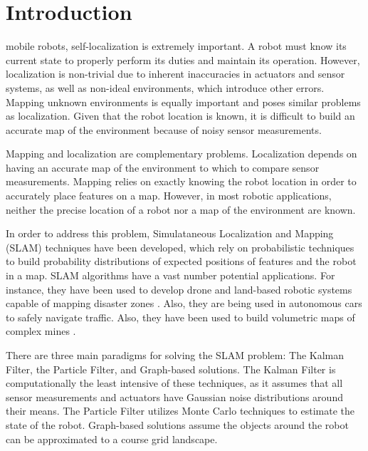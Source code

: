 \documentclass[journal]{IEEEtran}
\begin{document}
\section{Introduction}
% 
% 
% 
% 
 mobile robots, self-localization is extremely important. 
A robot must know its current state to properly perform its duties and maintain its operation. 
However, localization is non-trivial due to inherent inaccuracies in actuators and sensor 
systems, as well as non-ideal environments, which introduce other errors. Mapping unknown 
environments is equally important and poses similar problems as localization. Given that 
the robot location is known, it is difficult to build an accurate map of the environment 
because of noisy sensor measurements. 

Mapping and localization are complementary problems. Localization depends on having an 
accurate map of the environment to which to compare sensor measurements. Mapping relies 
on exactly knowing the robot location in order to accurately place features on a map. 
However, in most robotic applications, neither the precise location of a robot nor a 
map of the environment are known. 

In order to address this problem, Simulataneous Localization and Mapping (SLAM) techniques 
have been developed, which rely on probabilistic techniques to build probability 
distributions of expected positions of features and the robot in a map. SLAM algorithms 
have a vast number potential applications. For instance, they have been used to develop 
drone and land-based robotic systems capable of mapping disaster zones 
\cite{drone-response, mapping-disaster-areas}. Also, they are being used in autonomous cars to 
safely navigate traffic. Also, they have been used to build volumetric maps of complex mines
\cite{6d-mining-slam}.

There are three main paradigms for solving the SLAM problem: The Kalman Filter, the Particle 
Filter, and Graph-based solutions. The Kalman Filter is computationally the least intensive 
of these techniques, as it assumes that all sensor measurements and actuators have Gaussian 
noise distributions around their means. The Particle Filter utilizes Monte Carlo techniques 
to estimate the state of the robot. Graph-based solutions assume the objects around the robot 
can be approximated to a course grid landscape. \cite{prob-robots}
\end{document}
